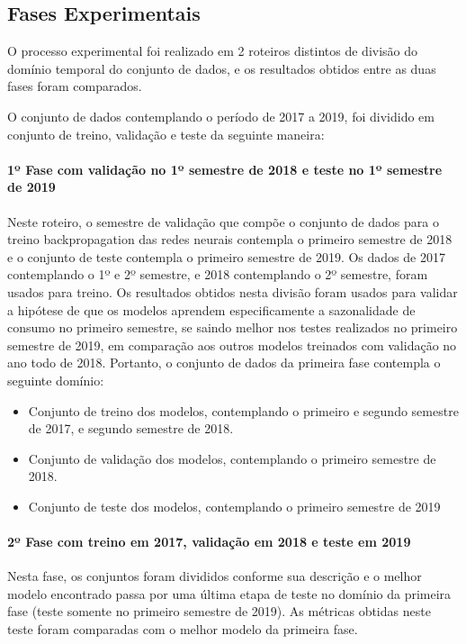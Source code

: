     	\subsection{Fases Experimentais}
            O processo experimental foi realizado em 2 roteiros distintos de divisão do domínio temporal do conjunto de dados, e os resultados obtidos entre as duas fases foram comparados.
            
            O conjunto de dados contemplando o período de 2017 a 2019, foi dividido em conjunto de treino, validação e teste da seguinte maneira: 
            
            \paragraph{1º Fase com validação no 1º semestre de 2018 e teste no 1º semestre de 2019}
                Neste roteiro, o semestre de validação que compõe o conjunto de dados para o treino backpropagation das redes neurais contempla o primeiro semestre de 2018 e o conjunto de teste contempla o primeiro semestre de 2019.
                Os dados de 2017 contemplando o 1º e 2º semestre, e 2018 contemplando o 2º semestre, foram usados para treino. Os resultados obtidos nesta divisão foram usados para validar a hipótese de que os modelos aprendem especificamente a sazonalidade de consumo no primeiro semestre, se saindo melhor nos testes realizados no primeiro semestre de 2019, em comparação aos outros modelos treinados com validação no ano todo de 2018.
                Portanto, o conjunto de dados da primeira fase contempla o seguinte domínio:
            \begin{itemize}
                    \item Conjunto de treino dos modelos, contemplando o primeiro e segundo semestre de 2017, e segundo semestre de 2018.
                    \item Conjunto de validação dos modelos, contemplando o primeiro semestre de 2018.
                    \item Conjunto de teste dos modelos, contemplando o primeiro semestre de 2019             
            \end{itemize}
            
            \paragraph{2º Fase com treino em 2017, validação em 2018 e teste em 2019}
                Nesta fase, os conjuntos foram divididos conforme sua descrição e o melhor modelo encontrado passa por uma última etapa de teste no domínio da primeira fase (teste somente no primeiro semestre de 2019).
                As métricas obtidas neste teste foram comparadas com o melhor modelo da primeira fase.
    
